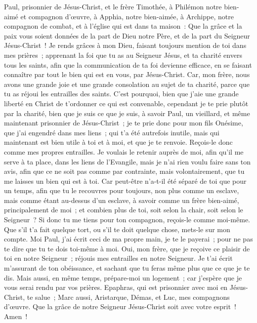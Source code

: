 \begin{multicols}{2}
\VerseOne{}Paul, prisonnier de Jésus-Christ, et le frère Timothée, à Philémon notre bien-aimé et compagnon d'œuvre,
à Apphia, notre bien-aimée, à Archippe, notre compagnon de combat, et à l'église qui est dans ta maison~:
Que la grâce et la paix vous soient données de la part de Dieu notre Père, et de la part du Seigneur Jésus-Christ~!
Je rends grâces à mon Dieu, faisant toujours mention de toi dans mes prières~;
apprenant la foi que tu as au Seigneur Jésus, et ta charité envers tous les saints,
afin que la communication de ta foi devienne efficace, en se faisant connaître par tout le bien qui est en vous, par Jésus-Christ.
Car, mon frère, nous avons une grande joie et une grande consolation au sujet de ta charité, parce que tu as réjoui les entrailles des saints.
C'est pourquoi, bien que j'aie une grande liberté en Christ de t'ordonner ce qui est convenable,
cependant je te prie plutôt par la charité, bien que je suis ce que je suis, à savoir Paul, un vieillard, et même maintenant prisonnier de Jésus-Christ~;
je te prie donc pour mon fils Onésime, que j'ai engendré dans mes liens~;
qui t'a été autrefois inutile, mais qui maintenant est bien utile à toi et à moi, et que je te renvoie.
Reçois-le donc comme mes propres entrailles.
Je voulais le retenir auprès de moi, afin qu'il me serve à ta place, dans les liens de l'Evangile,
mais je n'ai rien voulu faire sans ton avis, afin que ce ne soit pas comme par contrainte, mais volontairement, que tu me laisses un bien qui est à toi.
Car peut-être n'a-t-il été séparé de toi que pour un temps, afin que tu le recouvres pour toujours,
non plus comme un esclave, mais comme étant au-dessus d'un esclave, à savoir comme un frère bien-aimé, principalement de moi~; et combien plus de toi, soit selon la chair, soit selon le Seigneur~?
Si donc tu me tiens pour ton compagnon, reçois-le comme moi-même.
Que s'il t'a fait quelque tort, ou s'il te doit quelque chose, mets-le sur mon compte.
Moi Paul, j'ai écrit ceci de ma propre main, je te le payerai~; pour ne pas te dire que tu te dois toi-même à moi.
Oui, mon frère, que je reçoive ce plaisir de toi en notre Seigneur~; réjouis mes entrailles en notre Seigneur.
Je t'ai écrit m'assurant de ton obéissance, et sachant que tu feras même plus que ce que je te dis.
Mais aussi, en même temps, prépare-moi un logement~; car j'espère que je vous serai rendu par vos prières.
Epaphras, qui est prisonnier avec moi en Jésus-Christ, te salue~;
Marc aussi, Aristarque, Démas, et Luc, mes compagnons d'œuvre.
Que la grâce de notre Seigneur Jésus-Christ soit avec votre esprit~! Amen~!
\PPE{}
\end{multicols}
